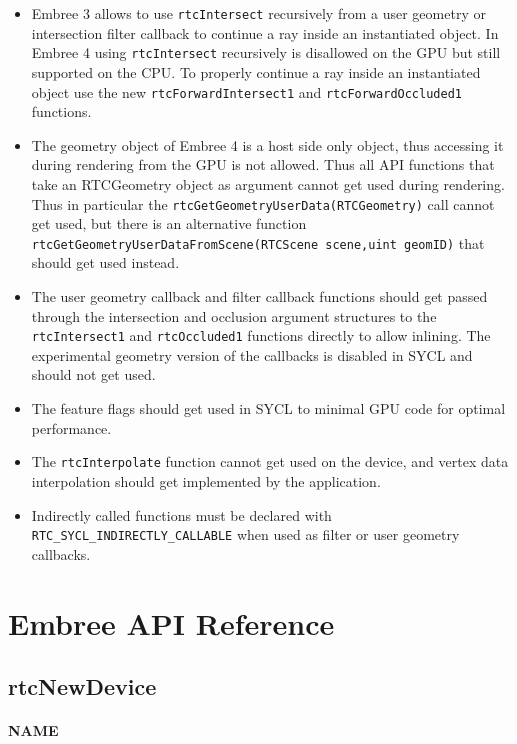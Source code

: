 \begin{itemize}
\item
  Embree 3 allows to use \texttt{rtcIntersect} recursively from a user
  geometry or intersection filter callback to continue a ray inside an
  instantiated object. In Embree 4 using \texttt{rtcIntersect}
  recursively is disallowed on the GPU but still supported on the CPU.
  To properly continue a ray inside an instantiated object use the new
  \texttt{rtcForwardIntersect1} and \texttt{rtcForwardOccluded1}
  functions.
\item
  The geometry object of Embree 4 is a host side only object, thus
  accessing it during rendering from the GPU is not allowed. Thus all
  API functions that take an RTCGeometry object as argument cannot get
  used during rendering. Thus in particular the
  \texttt{rtcGetGeometryUserData(RTCGeometry)} call cannot get used, but
  there is an alternative function
  \texttt{rtcGetGeometryUserDataFromScene(RTCScene\ scene,uint\ geomID)}
  that should get used instead.
\item
  The user geometry callback and filter callback functions should get
  passed through the intersection and occlusion argument structures to
  the \texttt{rtcIntersect1} and \texttt{rtcOccluded1} functions
  directly to allow inlining. The experimental geometry version of the
  callbacks is disabled in SYCL and should not get used.
\item
  The feature flags should get used in SYCL to minimal GPU code for
  optimal performance.
\item
  The \texttt{rtcInterpolate} function cannot get used on the device,
  and vertex data interpolation should get implemented by the
  application.
\item
  Indirectly called functions must be declared with
  \texttt{RTC\_SYCL\_INDIRECTLY\_CALLABLE} when used as filter or user
  geometry callbacks.
\end{itemize}

\pagebreak

\chapter{Embree API Reference}\label{embree-api-reference}

\section{rtcNewDevice}\label{rtcnewdevice}

\subsubsection{NAME}\label{name}

